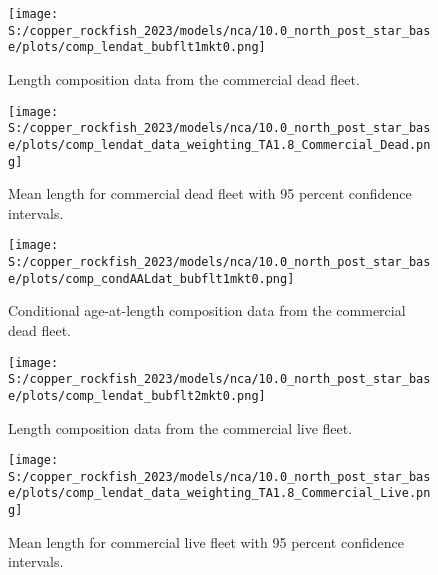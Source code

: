 \documentclass[11pt,
  letterpaper,
]{article}
\begin{document}
\begin{figure}
{\centering
\texttt{[image: S:/copper\_rockfish\_2023/models/nca/10.0\_north\_post\_star\_base/plots/comp\_lendat\_bubflt1mkt0.png]}
}
\caption{Length composition data from the commercial dead fleet.\label{fig:com-dead-len-data}}
\end{figure}

\begin{figure}
{\centering
\texttt{[image: S:/copper\_rockfish\_2023/models/nca/10.0\_north\_post\_star\_base/plots/comp\_lendat\_data\_weighting\_TA1.8\_Commercial\_Dead.png]}
}
\caption{Mean length for commercial dead fleet with 95 percent confidence intervals.\label{fig:mean-com-dead-len-data}}
\end{figure}

\begin{figure}
{\centering
\texttt{[image: S:/copper\_rockfish\_2023/models/nca/10.0\_north\_post\_star\_base/plots/comp\_condAALdat\_bubflt1mkt0.png]}
}
\caption{Conditional age-at-length composition data from the commercial dead fleet.\label{fig:com-dead-age-data}}
\end{figure}

\begin{figure}
{\centering
\texttt{[image: S:/copper\_rockfish\_2023/models/nca/10.0\_north\_post\_star\_base/plots/comp\_lendat\_bubflt2mkt0.png]}
}
\caption{Length composition data from the commercial live fleet.\label{fig:com-live-len-data}}
\end{figure}

\begin{figure}
{\centering
\texttt{[image: S:/copper\_rockfish\_2023/models/nca/10.0\_north\_post\_star\_base/plots/comp\_lendat\_data\_weighting\_TA1.8\_Commercial\_Live.png]}
}
\caption{Mean length for commercial live fleet with 95 percent confidence intervals.\label{fig:mean-com-live-len-data}}
\end{figure}
\end{document}
